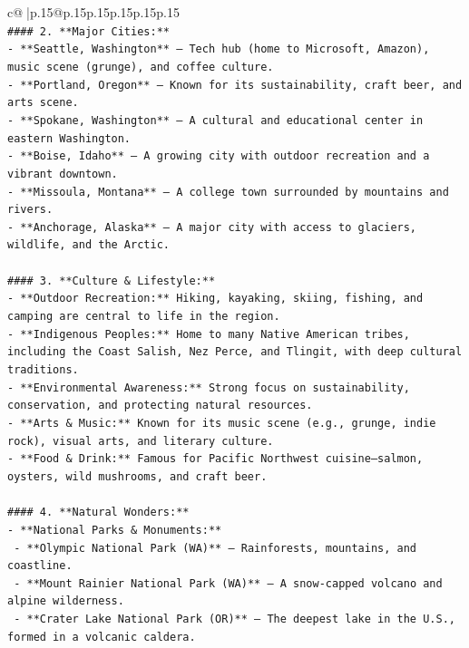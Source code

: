 \documentclass{article}
\begin{document}
{\begin{supertabular}{c@{$\;$}|p{.15\linewidth}@{}p{.15\linewidth}p{.15\linewidth}p{.15\linewidth}p{.15\linewidth}p{.15\linewidth}}
{{{\\ 
\texttt{\#\#\#\# 2. **Major Cities:**} \\
\texttt{{-} **Seattle, Washington** – Tech hub (home to Microsoft, Amazon), music scene (grunge), and coffee culture.} \\
\texttt{{-} **Portland, Oregon** – Known for its sustainability, craft beer, and arts scene.} \\
\texttt{{-} **Spokane, Washington** – A cultural and educational center in eastern Washington.} \\
\texttt{{-} **Boise, Idaho** – A growing city with outdoor recreation and a vibrant downtown.} \\
\texttt{{-} **Missoula, Montana** – A college town surrounded by mountains and rivers.} \\
\texttt{{-} **Anchorage, Alaska** – A major city with access to glaciers, wildlife, and the Arctic.} \\
\\ 
\texttt{\#\#\#\# 3. **Culture \& Lifestyle:**} \\
\texttt{{-} **Outdoor Recreation:** Hiking, kayaking, skiing, fishing, and camping are central to life in the region.} \\
\texttt{{-} **Indigenous Peoples:** Home to many Native American tribes, including the Coast Salish, Nez Perce, and Tlingit, with deep cultural traditions.} \\
\texttt{{-} **Environmental Awareness:** Strong focus on sustainability, conservation, and protecting natural resources.} \\
\texttt{{-} **Arts \& Music:** Known for its music scene (e.g., grunge, indie rock), visual arts, and literary culture.} \\
\texttt{{-} **Food \& Drink:** Famous for Pacific Northwest cuisine—salmon, oysters, wild mushrooms, and craft beer.} \\
\\ 
\texttt{\#\#\#\# 4. **Natural Wonders:**} \\
\texttt{{-} **National Parks \& Monuments:**} \\
\texttt{  {-} **Olympic National Park (WA)** – Rainforests, mountains, and coastline.} \\
\texttt{  {-} **Mount Rainier National Park (WA)** – A snow{-}capped volcano and alpine wilderness.} \\
\texttt{  {-} **Crater Lake National Park (OR)** – The deepest lake in the U.S., formed in a volcanic caldera.} \\
}}}
\end{supertabular}}
\end{document}
